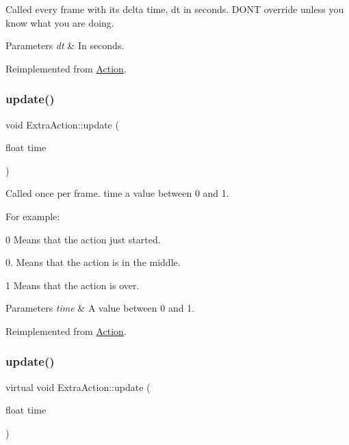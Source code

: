 Called every frame with it\textquotesingle{}s delta time, dt in seconds. D\+ON\textquotesingle{}T override unless you know what you are doing.


\begin{DoxyParams}{Parameters}
{\em dt} & In seconds. \\
\hline
\end{DoxyParams}


Reimplemented from \hyperlink{classAction_a9a64ee9e8e977672748f70893ebaff66}{Action}.

\mbox{\label{classExtraAction_a65059820b110dbea5b63cd7ac6278434}} 
\subsubsection{\texorpdfstring{update()}{update()}\hspace{0.1cm}{\footnotesize\ttfamily [1/2]}}
{\footnotesize\ttfamily void Extra\+Action\+::update (\begin{DoxyParamCaption}\item[{float}]{time }\end{DoxyParamCaption})\hspace{0.3cm}{\ttfamily [virtual]}}

Called once per frame. time a value between 0 and 1.

For example\+:
\begin{DoxyItemize}
\item 0 Means that the action just started.
\item 0. Means that the action is in the middle.
\item 1 Means that the action is over.
\end{DoxyItemize}


\begin{DoxyParams}{Parameters}
{\em time} & A value between 0 and 1. \\
\hline
\end{DoxyParams}


Reimplemented from \hyperlink{classAction_a937e646e63915e33ad05ba149bfcf239}{Action}.

\mbox{\label{classExtraAction_aea5391e5d22b807142a0f0226a8db170}} 
\subsubsection{\texorpdfstring{update()}{update()}\hspace{0.1cm}{\footnotesize\ttfamily [2/2]}}
{\footnotesize\ttfamily virtual void Extra\+Action\+::update (\begin{DoxyParamCaption}\item[{float}]{time }\end{DoxyParamCaption})\hspace{0.3cm}{\ttfamily [virtual]}}

